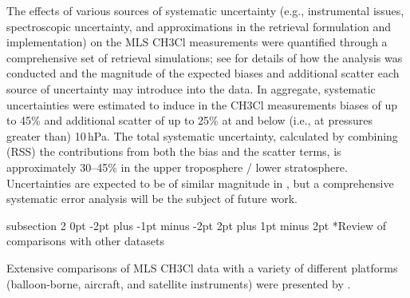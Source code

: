 \documentclass[11pt,draft]{report}
\makeatletter
\renewcommand{\subsection}{\@startsection%
  {subsection}%
  {2}%
  {0pt}%
  {-2pt plus -1pt minus -2pt}%
  {2pt plus 1pt minus 2pt}%
  {\large\sffamily\fontseries{sb}\selectfont\flushleft\color{SectionColor}\figureversion{tabular}}}%
\makeatother
\begin{document}
The effects of various sources of systematic uncertainty (e.g.,
instrumental issues, spectroscopic uncertainty, and approximations in
the retrieval formulation and implementation) on the MLS \prevv
CH\cs3Cl measurements were quantified through a comprehensive set of
retrieval simulations; see \citet{SanteeEtal13} for details of
how the analysis was conducted and the magnitude of the expected
biases and additional scatter each source of uncertainty may introduce
into the data.  In aggregate, systematic uncertainties were estimated
to induce in the \prevv CH\cs3Cl measurements biases of up to 45\% and
additional scatter of up to 25\% at and below (i.e., at pressures
greater than) 10\,hPa.  The total systematic uncertainty, calculated
by combining (RSS) the contributions from both the bias and the
scatter terms, is approximately 30--45\% in the upper troposphere /
lower stratosphere.  Uncertainties are expected to be of similar
magnitude in \thisv, but a comprehensive \thisv systematic error
analysis will be the subject of future work.

\subsection*{Review of comparisons with other datasets}

Extensive comparisons of MLS \prevv CH\cs3Cl data with a variety of
different platforms (balloon-borne, aircraft, and satellite instruments)
were presented by \citet{SanteeEtal13}.
\end{document}
